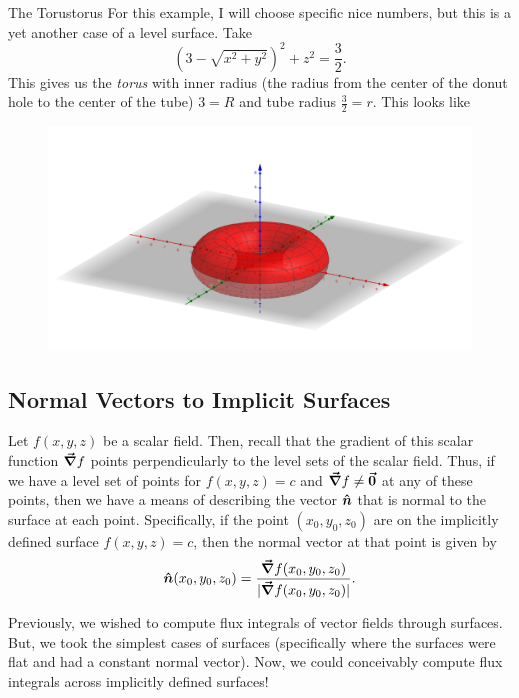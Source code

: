                 \begin{ex}{The Torus}{torus}
                For this example, I will choose specific nice numbers, but this is a yet another case of a level surface.  Take
                \[
                \left(3-\sqrt{x^2+y^2}\right)^2+z^2=\frac{3}{2}.
                \]
                This gives us the \emph{torus} with inner radius (the radius from the center of the donut hole to the center of the tube) $3=R$ and tube radius $\frac{3}{2}=r$. This looks like
                \begin{figure}[H]
                    \centering
                    \includegraphics[width=.8\textwidth]{Figures_Part_6/torus.png}
                \end{figure}
                \end{ex}


                 \subsection{Normal Vectors to Implicit Surfaces}

                 Let $f(x,y,z)$ be a scalar field.  Then, recall that the gradient of this scalar function $\boldsymbol{\vec{\nabla}} f$ points perpendicularly to the level sets of the scalar field.  Thus, if we have a level set of points for $f(x,y,z)=c$ and $\boldsymbol{\vec{\nabla}} f \neq \boldsymbol{\vec{0}}$ at any of these points, then we have a means of describing the vector $\boldsymbol{\hat{n}}$ that is normal to the surface at each point.  Specifically, if the point $(x_0,y_0,z_0)$ are on the implicitly defined surface $f(x,y,z)=c$, then the normal vector at that point is given by
                 \[
                 \boldsymbol{\hat{n}}(x_0,y_0,z_0) = \frac{\boldsymbol{\vec{\nabla}} f(x_0,y_0,z_0)}{|\boldsymbol{\vec{\nabla}} f(x_0,y_0,z_0)|}.
                 \]

                 Previously, we wished to compute flux integrals of vector fields through surfaces.  But, we took the simplest cases of surfaces (specifically where the surfaces were flat and had a constant normal vector).  Now, we could conceivably compute flux integrals across implicitly defined surfaces!

